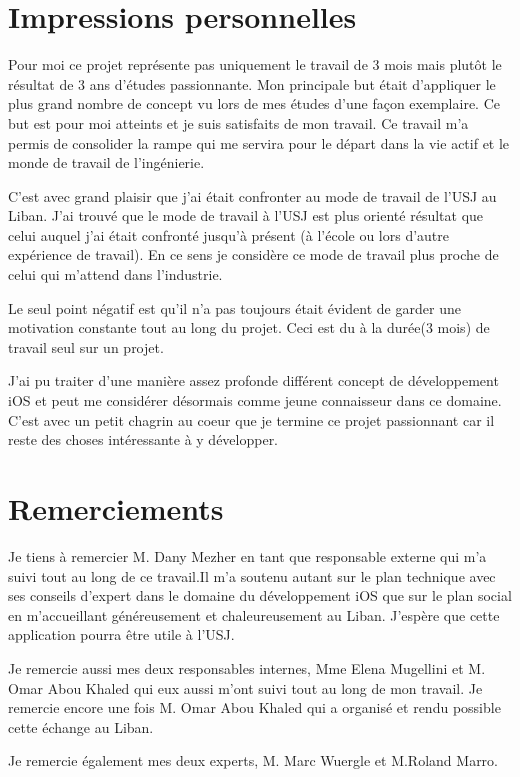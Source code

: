 \documentclass[12pt,a4paper,twoside]{report}
\begin{document}
\section{Impressions personnelles} 
Pour moi ce projet représente pas uniquement le travail de 3 mois mais plutôt le résultat de 3 ans d'études passionnante. Mon principale but était d'appliquer le plus grand nombre de concept vu lors de mes études d'une façon exemplaire. Ce but est pour moi atteints et je suis satisfaits de mon travail.  Ce travail m'a permis de consolider la rampe  qui me servira pour le départ dans la vie actif et le monde de travail de l'ingénierie.  
   
C'est avec grand plaisir que j'ai était confronter au mode de travail de l'USJ au Liban. J'ai trouvé que le mode de travail à l'USJ est plus orienté résultat que celui auquel j'ai était confronté jusqu'à présent (à l'école ou lors d'autre expérience de travail). En ce sens je considère ce mode de travail plus proche de celui qui m'attend dans l'industrie. 

Le seul point négatif est qu'il n'a pas toujours était évident de garder une motivation constante tout au long du projet. Ceci est du à la durée(3 mois) de travail seul sur un projet.

J'ai pu traiter d'une manière assez profonde différent concept de développement iOS et peut me considérer désormais comme jeune connaisseur dans ce domaine.
C'est avec un petit chagrin au coeur que je termine ce projet passionnant  car il reste des choses intéressante à y développer. 

\section{Remerciements}
Je tiens à remercier M. Dany Mezher  en tant que responsable externe qui m'a suivi tout au long de ce travail.Il m'a soutenu autant sur le plan technique avec ses conseils d'expert dans le domaine du développement iOS que sur le plan social en m'accueillant généreusement et chaleureusement au Liban. J'espère que cette application pourra être utile à l'USJ. 

Je remercie aussi mes deux responsables internes, Mme Elena Mugellini et M. Omar Abou Khaled qui eux aussi m'ont suivi tout au long de mon travail.
Je remercie encore une fois M. Omar Abou Khaled  qui a organisé et rendu possible cette échange au Liban. 

Je remercie également mes deux experts, M. Marc Wuergle et M.Roland Marro.
\end{document}
